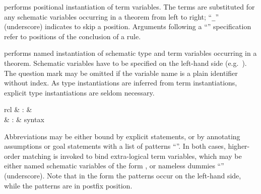 \begin{isabellebody}
\begin{isamarkuptext}
\begin{descr}
  \item [\isa{of}~\isa{t\isactrlsub {\isadigit{1}}\ {\isasymdots}\ t\isactrlsub n}] performs
  positional instantiation of term variables.  The terms  are substituted for any schematic
  variables occurring in a theorem from left to right; ``\verb|_|'' (underscore) indicates to skip a position.  Arguments following
  a ``\isa{{\isacharcolon}}'' specification refer to positions
  of the conclusion of a rule.
  
  \item [\isa{where}~\isa{x\isactrlsub {\isadigit{1}}\ {\isacharequal}\ t\isactrlsub {\isadigit{1}}\ {\isasymAND}\ {\isasymdots}\ {\isasymAND}\ x\isactrlsub n\ {\isacharequal}\ t\isactrlsub n}] performs named instantiation of
  schematic type and term variables occurring in a theorem.  Schematic
  variables have to be specified on the left-hand side (e.g.\ ).  The question mark may be omitted if the variable name is
  a plain identifier without index.  As type instantiations are
  inferred from term instantiations, explicit type instantiations are
  seldom necessary.

  \end{descr}%
\end{isamarkuptext}%
\isamarkuptrue%
%
\isamarkuptrue%
%
\begin{isamarkuptext}%
\begin{matharray}{rcl}
     & : &  \\
     & : & syntax \\
  \end{matharray}

  Abbreviations may be either bound by explicit  statements, or by annotating assumptions or goal statements
  with a list of patterns ``''.
  In both cases, higher-order matching is invoked to bind
  extra-logical term variables, which may be either named schematic
  variables of the form , or nameless dummies ``\isa{{\isacharunderscore}}'' (underscore). Note that in the  form the
  patterns occur on the left-hand side, while the 
  patterns are in postfix position.


\end{isamarkuptext}
\end{isabellebody}
